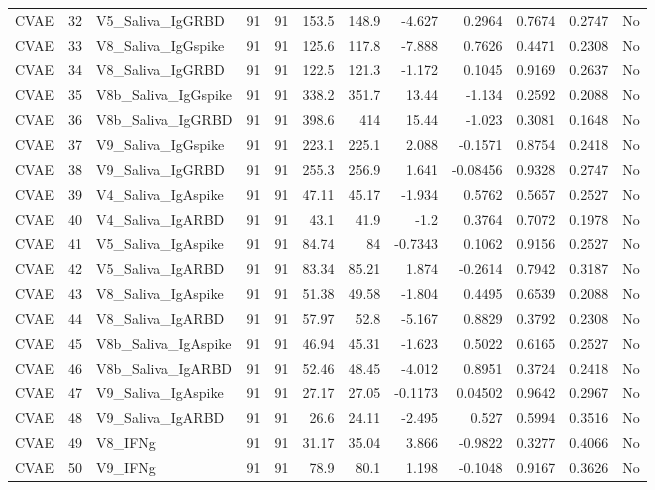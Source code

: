 \begin{longtable}{lrp{}rrrrrrrrl}
CVAE & 32 & V5\_Saliva\_IgGRBD & 91 & 91 & 153.5 & 148.9 & -4.627 & 0.2964 & 0.7674 & 0.2747 & No \\
CVAE & 33 & V8\_Saliva\_IgGspike & 91 & 91 & 125.6 & 117.8 & -7.888 & 0.7626 & 0.4471 & 0.2308 & No \\
CVAE & 34 & V8\_Saliva\_IgGRBD & 91 & 91 & 122.5 & 121.3 & -1.172 & 0.1045 & 0.9169 & 0.2637 & No \\
CVAE & 35 & V8b\_Saliva\_IgGspike & 91 & 91 & 338.2 & 351.7 & 13.44 & -1.134 & 0.2592 & 0.2088 & No \\
CVAE & 36 & V8b\_Saliva\_IgGRBD & 91 & 91 & 398.6 & 414 & 15.44 & -1.023 & 0.3081 & 0.1648 & No \\
CVAE & 37 & V9\_Saliva\_IgGspike & 91 & 91 & 223.1 & 225.1 & 2.088 & -0.1571 & 0.8754 & 0.2418 & No \\
CVAE & 38 & V9\_Saliva\_IgGRBD & 91 & 91 & 255.3 & 256.9 & 1.641 & -0.08456 & 0.9328 & 0.2747 & No \\
CVAE & 39 & V4\_Saliva\_IgAspike & 91 & 91 & 47.11 & 45.17 & -1.934 & 0.5762 & 0.5657 & 0.2527 & No \\
CVAE & 40 & V4\_Saliva\_IgARBD & 91 & 91 & 43.1 & 41.9 & -1.2 & 0.3764 & 0.7072 & 0.1978 & No \\
CVAE & 41 & V5\_Saliva\_IgAspike & 91 & 91 & 84.74 & 84 & -0.7343 & 0.1062 & 0.9156 & 0.2527 & No \\
CVAE & 42 & V5\_Saliva\_IgARBD & 91 & 91 & 83.34 & 85.21 & 1.874 & -0.2614 & 0.7942 & 0.3187 & No \\
CVAE & 43 & V8\_Saliva\_IgAspike & 91 & 91 & 51.38 & 49.58 & -1.804 & 0.4495 & 0.6539 & 0.2088 & No \\
CVAE & 44 & V8\_Saliva\_IgARBD & 91 & 91 & 57.97 & 52.8 & -5.167 & 0.8829 & 0.3792 & 0.2308 & No \\
CVAE & 45 & V8b\_Saliva\_IgAspike & 91 & 91 & 46.94 & 45.31 & -1.623 & 0.5022 & 0.6165 & 0.2527 & No \\
CVAE & 46 & V8b\_Saliva\_IgARBD & 91 & 91 & 52.46 & 48.45 & -4.012 & 0.8951 & 0.3724 & 0.2418 & No \\
CVAE & 47 & V9\_Saliva\_IgAspike & 91 & 91 & 27.17 & 27.05 & -0.1173 & 0.04502 & 0.9642 & 0.2967 & No \\
CVAE & 48 & V9\_Saliva\_IgARBD & 91 & 91 & 26.6 & 24.11 & -2.495 & 0.527 & 0.5994 & 0.3516 & No \\
CVAE & 49 & V8\_IFNg & 91 & 91 & 31.17 & 35.04 & 3.866 & -0.9822 & 0.3277 & 0.4066 & No \\
CVAE & 50 & V9\_IFNg & 91 & 91 & 78.9 & 80.1 & 1.198 & -0.1048 & 0.9167 & 0.3626 & No \\

\end{longtable}
